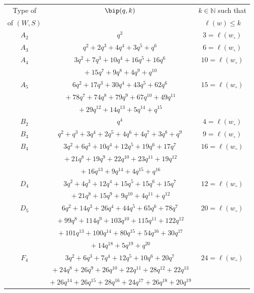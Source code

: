 \documentclass[ALCO,Unicode]{cedram}
\theoremstyle{definition}
\begin{document}
\begin{table}
\renewcommand\arraystretch{1.25}
\begin{center} 
\begin{tabular}{|c|c|c|}
\hline
Type of   &   $\bip(q,k)$   & $k\in\mathbb N$ such that  \\
of $(W,S)$  & $ $   &$\ell(w)\leq k$  \\
  \hline \hline
  $A_2$& $q^3$&$3=\ell(w_\circ)$\\
  \hline
  $A_3$& $q^2 + 2q^3 + 4q^4 + 3q^5 + q^6$&$6=\ell(w_\circ)$\\
  \hline
  $A_4$& $3q^2 + 7q^3 + 10q^4 + 16q^5 + 16q^6 $&$10=\ell(w_\circ)$\\
  &${}+ 15q^7 + 9q^8 + 4q^9 + q^{10}$& \\
    \hline
  $A_5$& $6q^2 + 17q^3 + 30q^4 + 43q^5 + 62q^6   $&$15=\ell(w_\circ)$\\
  &${}+ 78q^7 + 74q^8 + 79q^9+ 67q^{10} + 49q^{11} $& \\
  &${}+ 29q^{12} + 14q^{13} + 5q^{14} + q^{15}$& \\
 \hline
  $B_2$& $q^4 $&$4=\ell(w_\circ)$\\ 
   \hline
  $B_3$& $q^2 + q^3 + 3q^4 + 2q^5 + 4q^6 + 4q^7 + 3q^8 + q^9 $&$9=\ell(w_\circ)$\\ 
   \hline
  $B_4$& $3q^2 + 6q^3 + 10q^4 + 12q^5 + 19q^6 + 17q^7  $&$16=\ell(w_\circ)$\\ 
    &${}+ 21q^8 + 19q^9 + 22q^{10} + 23q^{11} + 19q^{12} $& \\
        &${}+ 16q^{13} + 9q^{14} + 4q^{15} + q^{16}$& \\
     \hline
  $D_4$& $3q^2 + 4q^3 + 12q^4 + 15q^5 + 15q^6 + 15q^7 $&$12=\ell(w_\circ)$\\
       &${}+ 21q^8 + 15q^9 + 9q^{10} + 4q^{11} + q^{12} $& \\
    \hline
  $D_5$& $ 6q^2 + 14q^3 + 26q^4 + 44q^5 + 65q^6 + 78q^7  $&$20=\ell(w_\circ)$\\
       &${}+ 99q^8 + 114q^9 + 103q^{10} + 115q^{11} + 122q^{12}   $& \\
       &${}+ 101q^{13}  + 100q^{14} + 80q^{15} + 54q^{16} + 30q^{17} $& \\
       &${}+ 14q^{18} + 5q^{19} + q^{20} $& \\
 \hline
  $F_4$& $ 3q^2 + 6q^3 + 7q^4 + 12q^5 + 10q^6 + 20q^7    $&$24=\ell(w_\circ)$\\
       &${} + 24q^8 + 26q^9 + 26q^{10} + 22q^{11} + 28q^{12} + 22q^{13}  $& \\
       &${}+ 26q^{14} + 26q^{15} + 28q^{16} + 24q^{17}+ 26q^{18} + 20q^{19} $&\\

\end{tabular}
\end{center}
\end{table}
\end{document}
